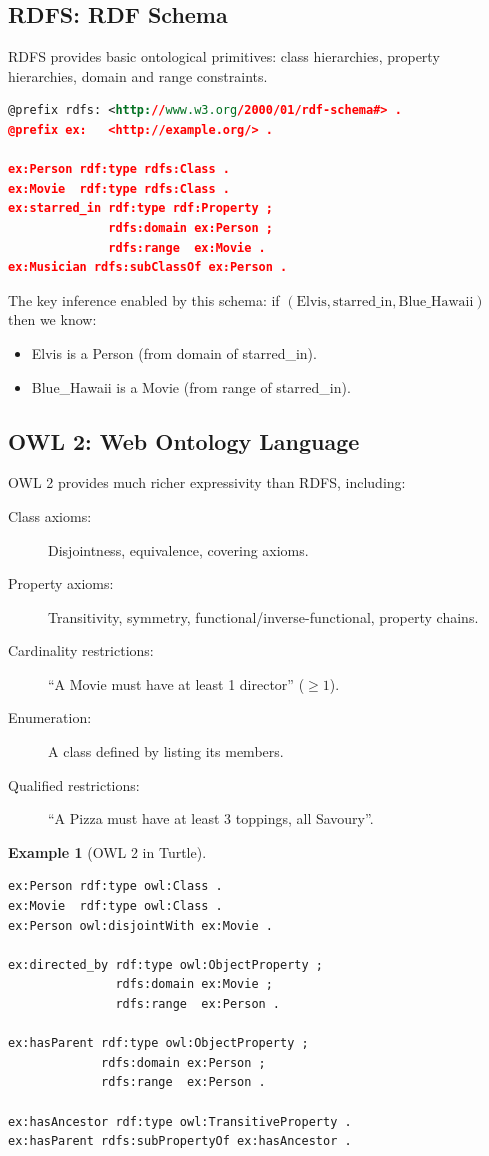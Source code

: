 \documentclass[11pt,a4paper,oneside,openany]{book}
\theoremstyle{definition}
\newtheorem{example}{Example}[chapter]
\theoremstyle{plain}
\theoremstyle{remark}
\begin{document}
\subsection{RDFS: RDF Schema}

RDFS provides basic ontological primitives: class hierarchies, property hierarchies, domain and range constraints.

\begin{lstlisting}[language=XML,numbers=none]
@prefix rdfs: <http://www.w3.org/2000/01/rdf-schema#> .
@prefix ex:   <http://example.org/> .

ex:Person rdf:type rdfs:Class .
ex:Movie  rdf:type rdfs:Class .
ex:starred_in rdf:type rdf:Property ;
              rdfs:domain ex:Person ;
              rdfs:range  ex:Movie .
ex:Musician rdfs:subClassOf ex:Person .
\end{lstlisting}

The key inference enabled by this schema: if $(\text{Elvis}, \text{starred\_in}, \text{Blue\_Hawaii})$ then we know:
\begin{itemize}
	\item Elvis is a Person (from domain of starred\_in).
	\item Blue\_Hawaii is a Movie (from range of starred\_in).
\end{itemize}

\subsection{OWL 2: Web Ontology Language}

OWL 2 provides much richer expressivity than RDFS, including:

\begin{description}
	\item[Class axioms:] Disjointness, equivalence, covering axioms.
	\item[Property axioms:] Transitivity, symmetry, functional/inverse-functional, property chains.
	\item[Cardinality restrictions:] ``A Movie must have at least 1 director'' ($\ge 1$).
	\item[Enumeration:] A class defined by listing its members.
	\item[Qualified restrictions:] ``A Pizza must have at least 3 toppings, all Savoury''.
\end{description}

\begin{example}[OWL 2 in Turtle]
	\label{ex:owl}
	\begin{lstlisting}[language=XML,numbers=none]
ex:Person rdf:type owl:Class .
ex:Movie  rdf:type owl:Class .
ex:Person owl:disjointWith ex:Movie .

ex:directed_by rdf:type owl:ObjectProperty ;
               rdfs:domain ex:Movie ;
               rdfs:range  ex:Person .

ex:hasParent rdf:type owl:ObjectProperty ;
             rdfs:domain ex:Person ;
             rdfs:range  ex:Person .

ex:hasAncestor rdf:type owl:TransitiveProperty .
ex:hasParent rdfs:subPropertyOf ex:hasAncestor .
\end{lstlisting}
\end{example}
\end{document}

